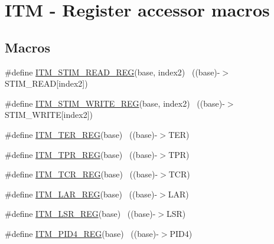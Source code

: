 \hypertarget{group___i_t_m___register___accessor___macros}{}\section{I\+TM -\/ Register accessor macros}
\label{group___i_t_m___register___accessor___macros}
\subsection*{Macros}
\begin{DoxyCompactItemize}
\item 
\#define \hyperlink{group___i_t_m___register___accessor___macros_ga5009882336aadcd4f37b45cf3395c450}{I\+T\+M\+\_\+\+S\+T\+I\+M\+\_\+\+R\+E\+A\+D\+\_\+\+R\+EG}(base,  index2)                  ~((base)-\/$>$S\+T\+I\+M\+\_\+\+R\+E\+AD\mbox{[}index2\mbox{]})
\item 
\#define \hyperlink{group___i_t_m___register___accessor___macros_ga049ca92a4e78e77c19af81e51aa73f1c}{I\+T\+M\+\_\+\+S\+T\+I\+M\+\_\+\+W\+R\+I\+T\+E\+\_\+\+R\+EG}(base,  index2)                ~((base)-\/$>$S\+T\+I\+M\+\_\+\+W\+R\+I\+TE\mbox{[}index2\mbox{]})
\item 
\#define \hyperlink{group___i_t_m___register___accessor___macros_ga0952675d3a89701dd186427f1c52c919}{I\+T\+M\+\_\+\+T\+E\+R\+\_\+\+R\+EG}(base)                                            ~((base)-\/$>$T\+ER)
\item 
\#define \hyperlink{group___i_t_m___register___accessor___macros_gaae645266e2d2ce5b4085486432dee954}{I\+T\+M\+\_\+\+T\+P\+R\+\_\+\+R\+EG}(base)                                            ~((base)-\/$>$T\+PR)
\item 
\#define \hyperlink{group___i_t_m___register___accessor___macros_gaded31ba9ed7d78748d2ec3fb8746caff}{I\+T\+M\+\_\+\+T\+C\+R\+\_\+\+R\+EG}(base)                                            ~((base)-\/$>$T\+CR)
\item 
\#define \hyperlink{group___i_t_m___register___accessor___macros_ga20b6604c5d16c42c91578bb58acc8249}{I\+T\+M\+\_\+\+L\+A\+R\+\_\+\+R\+EG}(base)                                            ~((base)-\/$>$L\+AR)
\item 
\#define \hyperlink{group___i_t_m___register___accessor___macros_gabbc1e9dd748b0d19926b2c64c868606d}{I\+T\+M\+\_\+\+L\+S\+R\+\_\+\+R\+EG}(base)                                            ~((base)-\/$>$L\+SR)
\item 
\#define \hyperlink{group___i_t_m___register___accessor___macros_ga0d86c795356f8b5785a8d32963143e18}{I\+T\+M\+\_\+\+P\+I\+D4\+\_\+\+R\+EG}(base)                                          ~((base)-\/$>$P\+I\+D4)

\end{DoxyCompactItemize}

